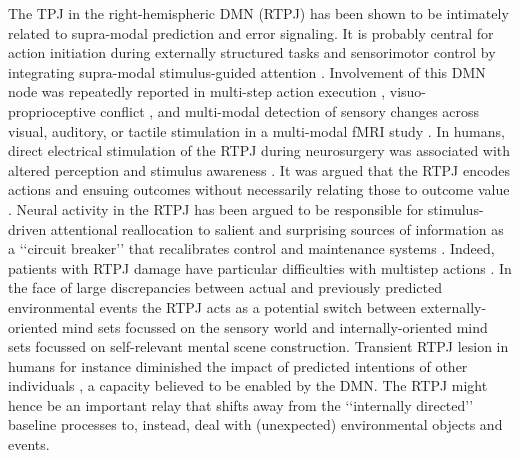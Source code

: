 \documentclass[10pt,letterpaper]{article}
\begin{document}
The TPJ in the right-hemispheric DMN (RTPJ)
has been shown to be intimately related to
supra-modal prediction and error signaling.
It is probably central for
action initiation during externally structured tasks and
sensorimotor control by integrating supra-modal stimulus-guided attention
\citep{corbetta2002control}.
Involvement of this DMN node was repeatedly reported in
multi-step action execution \citep{hartmann2005takes},
visuo-proprioceptive conflict \citep{Balslev2005}, and
multi-modal detection of sensory changes across
visual, auditory, or tactile stimulation in a multi-modal fMRI study
\citep{downar2000multimodal}.
In humans, direct electrical stimulation of the
RTPJ during neurosurgery was associated with altered perception
and stimulus awareness \citep{blanke2002neuropsychology}.
%
It was argued that the RTPJ encodes actions and ensuing outcomes
without necessarily relating those to outcome value
\citep{liljeholm2013neural, hamilton2008action,
jakobs2009effects}.
Neural activity in the RTPJ has been argued to be responsible
for stimulus-driven attentional reallocation to
salient and surprising sources of information
as a ‘‘circuit breaker’’ that recalibrates control and maintenance systems
\citep{bzdok2013tpj, corbettashul2008}.
Indeed, patients with RTPJ damage have particular difficulties
with multistep actions \citep{hartmann2005takes}.
In the face of large discrepancies between actual and previously predicted
environmental events the RTPJ acts as a potential switch between
externally-oriented mind sets focussed on the
sensory world and internally-oriented mind sets focussed
on self-relevant mental scene construction.
Transient RTPJ lesion in humans for instance diminished the
impact of predicted intentions of other individuals
\citep{young2010disruption},
a capacity believed to be enabled by the DMN.
The RTPJ might hence be an important relay that shifts away
from the ‘‘internally directed’’ baseline processes
to, instead, deal with (unexpected) environmental objects and events.
\end{document}
